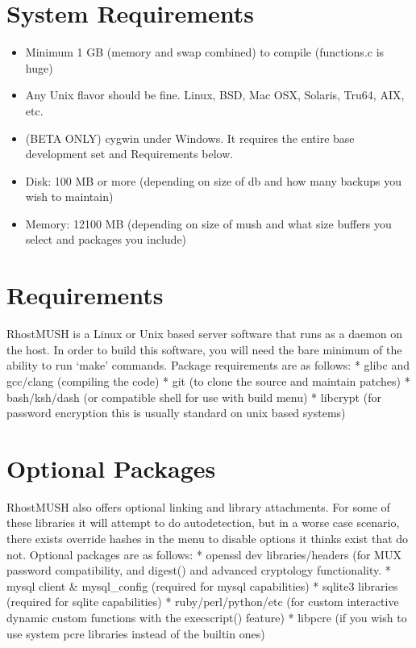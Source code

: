 \documentclass[letterpaper,10pt,english]{sphinxmanual}
\begin{document}
\section{System Requirements}
\label{\detokenize{requirements:system-requirements}}\begin{itemize}
\item {} 
\sphinxAtStartPar
Minimum 1 GB (memory and swap combined) to compile (functions.c is huge)

\item {} 
\sphinxAtStartPar
Any Unix flavor should be fine.  Linux, BSD, Mac OSX, Solaris, Tru64, AIX, etc.

\item {} 
\sphinxAtStartPar
(BETA ONLY) cygwin under Windows.  It requires the entire base development set and Requirements below.

\item {} 
\sphinxAtStartPar
Disk:  100 MB or more (depending on size of db and how many backups you wish to maintain)

\item {} 
\sphinxAtStartPar
Memory: 12\sphinxhyphen{}100 MB (depending on size of mush and what size buffers you select and packages you include)

\end{itemize}


\section{Requirements}
\label{\detokenize{requirements:id2}}
\sphinxAtStartPar
RhostMUSH is a Linux or Unix based server software that runs as a daemon on the host.  In order to build this software, you will need the bare minimum of the ability to run ‘make’ commands.  Package requirements are as follows:
* glibc and gcc/clang (compiling the code)
* git (to clone the source and maintain patches)
* bash/ksh/dash (or compatible shell \sphinxhyphen{} for use with build menu)
* libcrypt (for password encryption \sphinxhyphen{} this is usually standard on unix based systems)


\section{Optional Packages}
\label{\detokenize{requirements:optional-packages}}
\sphinxAtStartPar
RhostMUSH also offers optional linking and library attachments.  For some of these libraries it will attempt to do auto\sphinxhyphen{}detection, but in a worse case scenario, there exists override hashes in the menu to disable options it thinks exist that do not.  Optional packages are as follows:
* openssl dev libraries/headers (for MUX password compatibility, and digest() and advanced cryptology functionality.
* mysql client \& mysql\_config (required for mysql capabilities)
* sqlite3 libraries (required for sqlite capabilities)
* ruby/perl/python/etc (for custom interactive dynamic custom functions with the execscript() feature)
* libpcre (if you wish to use system pcre libraries instead of the built\sphinxhyphen{}in ones)
\end{document}
